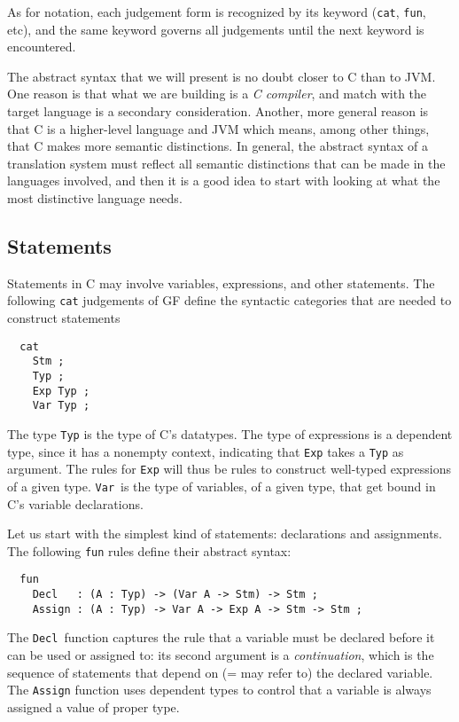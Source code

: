 \documentclass[12pt]{article}
\newcommand{\empha}[1]{{\em #1}}
\begin{document}
As for notation, each judgement form is recognized by
its keyword (\texttt{cat}, \texttt{fun}, etc), 
and the same keyword governs all judgements
until the next keyword is encountered.

The abstract syntax that we will present is no doubt closer
to C than to JVM. One reason is that what we are building is a
\textit{C compiler}, and match with the target language is a
secondary consideration. Another, more general reason is that
C is a higher-level language and JVM which means, among
other things, that C makes more semantic distinctions.
In general, the abstract syntax of a translation system
must reflect all semantic distinctions that can be made
in the languages involved, and then it is a good idea to
start with looking at what the most distinctive language
needs.



\subsection{Statements}

Statements in C may involve variables, expressions, and
other statements.
The following \texttt{cat} judgements of GF define the syntactic categories
that are needed to construct statements
\begin{verbatim}
  cat
    Stm ;
    Typ ;
    Exp Typ ;
    Var Typ ;
\end{verbatim}
The type \texttt{Typ} is the type of C's datatypes.
The type of expressions is a dependent type, 
since it has a nonempty context, indicating that \texttt{Exp} takes
a \texttt{Typ} as argument. The rules for \texttt{Exp}
will thus be rules to construct well-typed expressions of
a given type. \texttt{Var}\ is the type of variables,
of a given type, that get bound in C's variable
declarations.

Let us start with the simplest kind of statements:
declarations and assignments. The following \texttt{fun}
rules define their abstract syntax:
\begin{verbatim}
  fun
    Decl   : (A : Typ) -> (Var A -> Stm) -> Stm ;
    Assign : (A : Typ) -> Var A -> Exp A -> Stm -> Stm ;
\end{verbatim}
The \texttt{Decl}\ function captures the rule that
a variable must be declared before it can be used or assigned to:
its second argument is a \empha{continuation}, which is
the sequence of statements that depend on (= may refer to)
the declared variable. 
The \texttt{Assign} function uses dependent types to 
control that a variable is always assigned a value of proper
type. 
\end{document}
